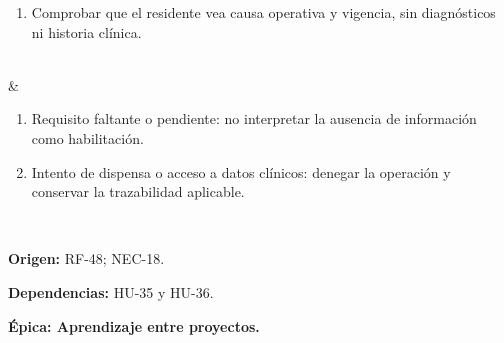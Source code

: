 \documentclass[12pt,letterpaper]{article}
\begin{document}
{\begin{enumerate}[nosep,leftmargin=*]
\item Comprobar que el residente vea causa operativa y vigencia, sin diagnósticos ni historia clínica.
\end{enumerate}\\\hline
{} & \begin{enumerate}[nosep,leftmargin=*]
\item Requisito faltante o pendiente: no interpretar la ausencia de información como habilitación.
\item Intento de dispensa o acceso a datos clínicos: denegar la operación y conservar la trazabilidad aplicable.
\end{enumerate}\\\hline
}
{\textbf{Origen:} RF-48; NEC-18.\par
\textbf{Dependencias:} HU-35 y HU-36.}

\textbf{Épica: Aprendizaje entre proyectos.}\par
\end{document}
